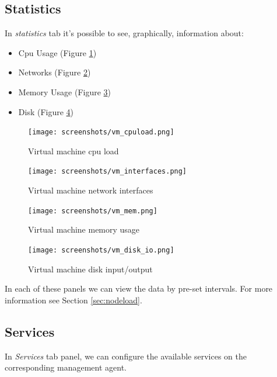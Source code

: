 \subsection{Statistics}
In \emph{statistics} tab it's possible to see, graphically, information about:
\begin{itemize}
	\item Cpu Usage (Figure \ref{fig:vm_cpuload})
	\item Networks (Figure \ref{fig:vm_interfaces})
	\item Memory Usage (Figure \ref{fig:vm_mem})
	\item Disk (Figure \ref{fig:vm_disk_io})
\end{itemize}


\begin{figure}[H]
	\begin{center}
	\texttt{[image: screenshots/vm\_cpuload.png]}
	\caption{Virtual machine cpu load}
	\label{fig:vm_cpuload}
	\end{center}
\end{figure}

\begin{figure}[H]
	\begin{center}
	\texttt{[image: screenshots/vm\_interfaces.png]}
	\caption{Virtual machine network interfaces}
	\label{fig:vm_interfaces}
	\end{center}
\end{figure}

\begin{figure}[H]
	\begin{center}
	\texttt{[image: screenshots/vm\_mem.png]}
	\caption{Virtual machine memory usage}
	\label{fig:vm_mem}
	\end{center}
\end{figure}

\begin{figure}[H]
	\begin{center}
	\texttt{[image: screenshots/vm\_disk\_io.png]}
	\caption{Virtual machine disk input/output}
	\label{fig:vm_disk_io}
	\end{center}
\end{figure}

In each of these panels we can view the data by pre-set intervals. For more information see Section \ref{sec:nodeload}.

\subsection{Services}
In \emph{Services} tab panel, we can configure the available services on the corresponding management agent.

